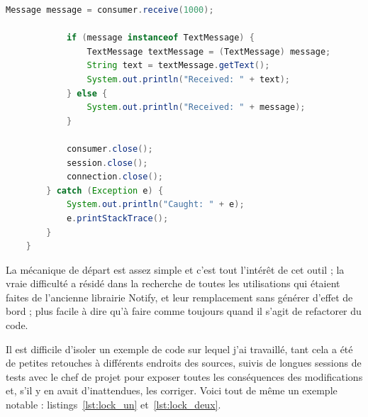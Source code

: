 \begin{minipage}{\linewidth}
\begin{lstlisting}[language=Java, caption="Un exemple écourté d'échange de messages \textit{via} ActiveMQ", label={lst:activemqex}]
            Message message = consumer.receive(1000);

            if (message instanceof TextMessage) {
                TextMessage textMessage = (TextMessage) message;
                String text = textMessage.getText();
                System.out.println("Received: " + text);
            } else {
                System.out.println("Received: " + message);
            }

            consumer.close();
            session.close();
            connection.close();
        } catch (Exception e) {
            System.out.println("Caught: " + e);
            e.printStackTrace();
        }
    }
\end{lstlisting}
\end{minipage}

La mécanique de départ est assez simple et c'est tout l'intérêt de cet outil ; la vraie difficulté a résidé dans la recherche de toutes les utilisations qui étaient faites de l'ancienne librairie Notify, et leur remplacement sans générer d'effet de bord ; plus facile à dire qu'à faire comme toujours quand il s'agit de refactorer du code.

Il est difficile d'isoler un exemple de code sur lequel j'ai travaillé, tant cela a été de petites retouches à différents endroits des sources, suivis de longues sessions de tests avec le chef de projet pour exposer toutes les conséquences des modifications et, s'il y en avait d'inattendues, les corriger. Voici tout de même un exemple notable : listings~\ref{lst:lock_un} et~\ref{lst:lock_deux}.

